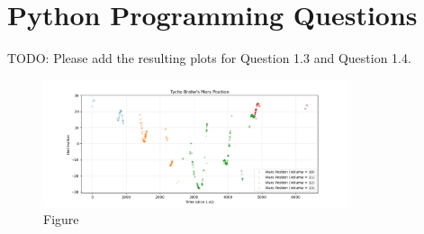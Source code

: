 \documentclass[12pt]{article}
\begin{document}
\section{Python Programming Questions}

TODO: Please add the resulting plots for Question 1.3 and Question 1.4.

\begin{figure}
\centering
\includegraphics[width=0.8\textwidth]{example-figure.png}
\caption{Figure}
\end{figure}
\end{document}
